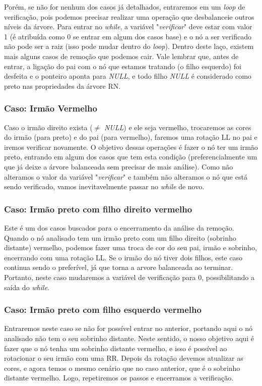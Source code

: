 \documentclass[a4paper,11pt]{article}
\begin{document}
    Porém, se não for nenhum dos casos já detalhados, entraremos em um \textit{loop} de verificação, pois podemos precisar realizar uma operação que desbalanceie outros níveis da árvore. Para entrar no \textit{while}, a variável "\textit{verificar}" deve estar com valor 1 (é atribuída como 0 se entrar em algum dos casos base) e o nó a ser verificado não pode ser a raiz (isso pode mudar dentro do \textit{loop}). Dentro deste laço, existem mais alguns casos de remoção que podemos cair. Vale lembrar que, antes de entrar, a ligação do pai com o nó que estamos tratando (o filho esquerdo) foi desfeita e o ponteiro aponta para \textit{NULL}, e todo filho \textit{NULL} é considerado como preto nas propriedades da árvore RN.
    \smallskip
    \subsubsection{Caso: Irmão Vermelho}
        Caso o irmão direito exista ($\neq$ \textit{NULL}) e ele seja vermelho, trocaremos as cores do irmão (para preto) e do pai (para vermelho), faremos uma rotação LL no pai e iremos verificar novamente. O objetivo dessas operações é fazer o nó ter um irmão preto, entrando em algum dos casos que tem esta condição (preferencialmente um que já deixe a árvore balanceada sem precisar de mais análise). Como não alteramos o valor da variável "\textit{verificar}" e também não alteramos o nó que está sendo verificado, vamos inevitavelmente passar no \textit{while} de novo.
        
    \subsubsection{Caso: Irmão preto com filho direito vermelho}
        Este é um dos casos buscados para o encerramento da análise da remoção. Quando o nó analisado tem um irmão preto com um filho direito (sobrinho distante) vermelho, podemos fazer uma troca de cor do seu pai, irmão e sobrinho, encerrando com uma rotação LL. Se o irmão do nó tiver dois filhos, este caso continua sendo o preferível, já que torna a arvore balanceada ao terminar. Portanto, neste caso mudaremos a variável de verificação para 0, possibilitando a saída do \textit{while}.
        
    \subsubsection{Caso: Irmão preto com filho esquerdo vermelho}
        Entraremos neste caso se não for possível entrar no anterior, portando aqui o nó analisado não tem o seu sobrinho distante. Neste sentido, o nosso objetivo aqui é fazer que o nó tenha um sobrinho distante vermelho, e isso é possível ao rotacionar o seu irmão com uma RR. Depois da rotação devemos atualizar as cores, e agora temos o mesmo cenário que no caso anterior, que é o sobrinho distante vermelho. Logo, repetiremos os passos e encerramos a verificação.
        
\end{document}
